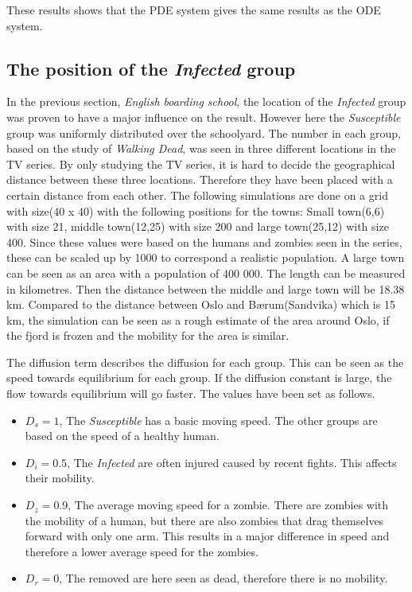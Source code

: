 \documentclass[%
twoside,                 %
final,                   %
10pt]{article}
\begin{document}
\noindent
These results shows that the PDE system gives the same results as the ODE system.



\subsection{The position of the \emph{Infected} group}
In the previous section, \emph{English boarding school}, the location of the \emph{Infected} group was proven to have a major influence on the result. However here the \emph{Susceptible} group was uniformly distributed over the schoolyard. The number in each group, based on the study of \emph{Walking Dead}, was seen in three different locations in the TV series. By only studying the TV series, it is hard to decide the geographical distance between these three locations. Therefore they have been placed with a certain distance from each other. The following simulations are done on a grid with size(40 x 40) with the following positions for the towns: Small town(6,6) with size 21, middle town(12,25) with size 200 and large town(25,12) with size 400. Since these values were based on the humans and zombies seen in the series, these can be scaled up by 1000 to correspond a realistic population. A large town can be seen as an area with a population of 400 000. The length can be measured in kilometres. Then the distance between the middle and large town will be 18.38 km. Compared to the distance between Oslo and Bærum(Sandvika) which is 15 km, the simulation can be seen as a rough estimate of the area around Oslo, if the fjord is frozen and the mobility for the area is similar.


\vspace{3mm}




\vspace{3mm}


The diffusion term describes the diffusion for each group. This can be seen as the speed towards equilibrium for each group. If the diffusion constant is large, the flow towards equilibrium will go faster. The values have been set as follows. 
\begin{itemize}
\item $D_s=1$, The \emph{Susceptible} has a basic moving speed. The other groups are based on the speed of a healthy human.

\item $D_i=0.5$, The \emph{Infected} are often injured caused by recent fights. This affects their mobility.

\item $D_z=0.9$, The average moving speed for a zombie. There are zombies with the mobility of a human, but there are also zombies that drag themselves forward with only one arm. This results in a major difference in speed and therefore a lower average speed for the zombies.

\item $D_r=0$, The removed are here seen as dead, therefore there is no mobility.
\end{itemize}
\end{document}
